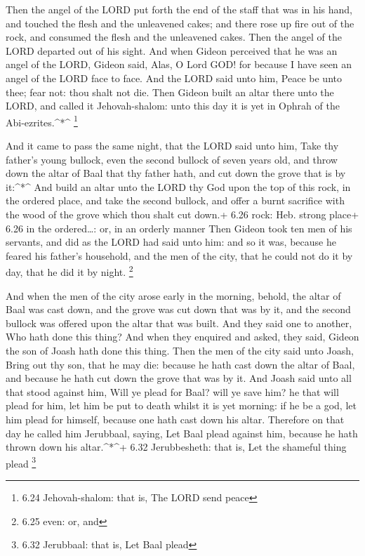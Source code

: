  Then the angel of the LORD put forth the end of the staff
that was in his hand, and touched the flesh and the unleavened cakes;
and there rose up fire out of the rock, and consumed the flesh and the
unleavened cakes. Then the angel of the LORD departed out of his sight.
 And when Gideon perceived that he was an angel of the
LORD, Gideon said, Alas, O Lord GOD! for because I have seen an angel of
the LORD face to face.  And the LORD said unto him, Peace
be unto thee; fear not: thou shalt not die.  Then Gideon
built an altar there unto the LORD, and called it Jehovah-shalom: unto
this day it is yet in Ophrah of the Abi-ezrites.\^{}*\^{} \footnote{6.24
  Jehovah-shalom: that is, The LORD send peace}

 And it came to pass the same night, that the LORD said
unto him, Take thy father's young bullock, even the second bullock of
seven years old, and throw down the altar of Baal that thy father hath,
and cut down the grove that is by it:\^{}*\^{}  And build
an altar unto the LORD thy God upon the top of this rock, in the ordered
place, and take the second bullock, and offer a burnt sacrifice with the
wood of the grove which thou shalt cut down.+ 6.26 rock: Heb. strong
place+ 6.26 in the ordered\ldots: or, in an orderly manner 
Then Gideon took ten men of his servants, and did as the LORD had said
unto him: and so it was, because he feared his father's household, and
the men of the city, that he could not do it by day, that he did it by
night. \footnote{6.25 even: or, and}

 And when the men of the city arose early in the morning,
behold, the altar of Baal was cast down, and the grove was cut down that
was by it, and the second bullock was offered upon the altar that was
built.  And they said one to another, Who hath done this
thing? And when they enquired and asked, they said, Gideon the son of
Joash hath done this thing.  Then the men of the city said
unto Joash, Bring out thy son, that he may die: because he hath cast
down the altar of Baal, and because he hath cut down the grove that was
by it.  And Joash said unto all that stood against him,
Will ye plead for Baal? will ye save him? he that will plead for him,
let him be put to death whilst it is yet morning: if he be a god, let
him plead for himself, because one hath cast down his altar.
 Therefore on that day he called him Jerubbaal, saying, Let
Baal plead against him, because he hath thrown down his altar.\^{}*\^{}+
6.32 Jerubbesheth: that is, Let the shameful thing plead \footnote{6.32
  Jerubbaal: that is, Let Baal plead}


